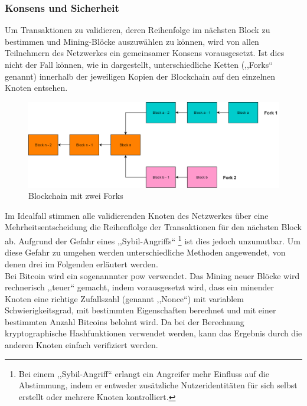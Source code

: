     \subsubsection{Konsens und Sicherheit}
    \label{sec:sota_blockchain_consensus}
        Um Transaktionen zu validieren, deren Reihenfolge im nächsten Block zu bestimmen und Mining-Blöcke auszuwählen zu können, wird von allen Teilnehmern des Netzwerkes ein gemeinsamer Konsens vorausgesetzt. 
        Ist dies nicht der Fall können, wie in  dargestellt, unterschiedliche Ketten (,,Forks`` genannt) innerhalb der jeweiligen Kopien der Blockchain auf den einzelnen Knoten entsehen. 
        \noindent
        \begin{figure}[H]
        	\centering
        	\includegraphics[width=\textwidth]{graphics/BCForks.png}
        	\caption[Blockchain mit Forks]{Blockchain mit zwei Forks}
        	\label{fig:bc_forks}
        \end{figure}
        \noindent Im Idealfall stimmen alle validierenden Knoten des Netzwerkes über eine Mehrheitsentscheidung die Reihenflolge der Transaktionen für den nächsten Block ab.\cite{Christidis2016} 
        Aufgrund der Gefahr eines ,,Sybil-Angriffs``\cite{Trifa2014}
        \!\footnote{Bei einem ,,Sybil-Angriff`` erlangt ein Angreifer mehr Einfluss auf die Abstimmung, indem er entweder zusätzliche Nutzeridentitäten für sich selbst erstellt oder mehrere Knoten kontrolliert.
        } ist dies jedoch unzumutbar.
        Um diese Gefahr zu umgehen werden unterschiedliche Methoden angewendet, von denen drei im Folgenden erläutert werden\cite{Christidis2016}.
        \medskip\\
        Bei Bitcoin wird ein sogenannnter \gls{pow} verwendet. 
        Das Mining neuer Blöcke wird rechnerisch ,,teuer`` gemacht, indem vorausgesetzt wird, dass ein minender Knoten eine richtige Zufallszahl (genannt ,,Nonce``) mit variablem Schwierigkeitsgrad, mit bestimmten Eigenschaften berechnet und mit einer bestimmten Anzahl Bitcoins belohnt wird. 
        Da bei der Berechnung kryptographische Hashfunktionen verwendet werden, kann das Ergebnis durch die anderen Knoten einfach verifiziert werden. 
